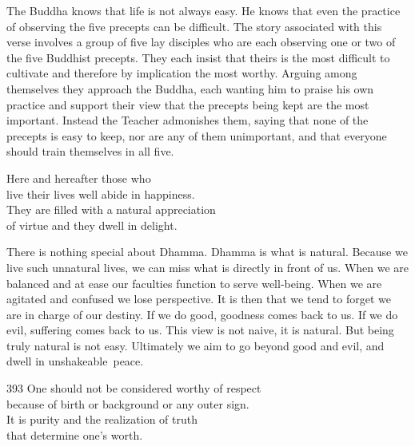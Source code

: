 \begin{dhpRefl}
  The Buddha knows that life is not always easy. He knows that even the practice
  of observing the five precepts can be difficult. The story associated with
  this verse involves a group of five lay disciples who are each observing one
  or two of the five Buddhist precepts. They each insist that theirs is the most
  difficult to cultivate and therefore by implication the most worthy. Arguing
  among themselves they approach the Buddha, each wanting him to praise his own
  practice and support their view that the precepts being kept are the most
  important. Instead the Teacher admonishes them, saying that none of the
  precepts is easy to keep, nor are any of them unimportant, and that everyone
  should train themselves in all five.
\end{dhpRefl}


\begin{dhpVerse}{18}
\label{dhp-18}
Here and hereafter those who\\
live their lives well abide in happiness.\\
They are filled with a natural appreciation\\
of virtue and they dwell in delight.
\end{dhpVerse}

\begin{dhpRefl}
  There is nothing special about Dhamma. Dhamma is what is natural. Because we
  live such unnatural lives, we can miss what is directly in front of us. When
  we are balanced and at ease our faculties function to serve well-being. When
  we are agitated and confused we lose perspective. It is then that we tend to
  forget we are in charge of our destiny. If we do good, goodness comes back to
  us. If we do evil, suffering comes back to us. This view is not naive, it is
  natural. But being truly natural is not easy. Ultimately we aim to go beyond
  good and evil, and dwell in unshakeable~peace.
\end{dhpRefl}


\begin{dhpVerse}{393}
\label{dhp-393}
One should not be considered worthy of respect\\
because of birth or background or any outer sign.\\
It is purity and the realization of truth\\
that determine one's worth.
\end{dhpVerse}

